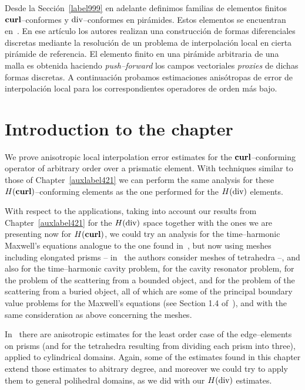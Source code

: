 Desde la Secci\'on~\ref{label999} en adelante definimos
familias de elementos finitos 
$\textbf{curl}$--conformes y $\operatorname{\textrm{div}}$--conformes en pi\-r\'ami\-des. Estos elementos
se encuentran en~\cite{gh99}. En ese art\'iculo los autores
realizan una construcci\'on de formas diferenciales discretas
mediante la resoluci\'on de un problema de interpolaci\'on local
en cierta pi\-r\'ami\-de de referencia. El elemento finito en una
pi\-r\'ami\-de arbitraria de una malla es obtenida haciendo \emph{push--forward}
los campos vectoriales \emph{proxies} de dichas formas discretas.
A continuaci\'on probamos estimaciones anis\'otropas de error de interpolaci\'on
local para los correspondientes operadores de orden m\'as bajo.

\section*{Introduction to the chapter}

We prove anisotropic local interpolation error estimates for the
$\textbf{curl}$--con\-for\-ming operator of arbitrary order over a prismatic element.
With techniques similar to those of Chapter~\ref{auxlabel421} we can
perform the same analysis for these $H(\textbf{curl})$--con\-for\-ming elements
as the one performed for the $H(\operatorname{\textrm{div}})$ elements.

With respect to the applications,
taking into account our results 
from Chapter~\ref{auxlabel421}
for the $H(\operatorname{\textrm{div}})$ space together with the ones we are presenting now
for $H(\textbf{curl})$, we could try an analysis for the
time--harmonic Maxwell's equations analogue to the one found
in~\cite{buffaCostabelDauge}, but now using meshes including
elongated prisms -- in~\cite{buffaCostabelDauge} the authors consider
meshes of tetrahedra --, and also for the time--harmonic cavity problem,
for the cavity resonator problem, for the problem of the scattering from a 
bounded object, and for the problem of the scattering from a
buried object, all of which are some of the principal boundary value
problems for the Maxwell's equations (see Section 1.4 of~\cite{monk}),
and with the same consideration as above concerning the meshes.

In~\cite{MR1860445} there are anisotropic estimates for 
the least order case of the edge--elements on prisms
(and for the tetrahedra resulting from dividing each prism into three),
applied to cylindrical domains.
Again, some of the estimates found in this chapter extend those estimates
to abitrary degree, and moreover we could try to apply them
to general polihedral domains, as we did with our $H(\operatorname{\textrm{div}})$ estimates.

